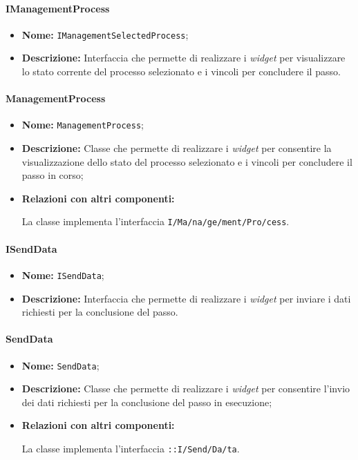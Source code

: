 \paragraph{IManagementProcess}
\begin{itemize}
\item \textbf{Nome:} \texttt{IManagementSelectedProcess};
\item \textbf{Descrizione:} Interfaccia che permette di realizzare i \textit{widget} per visualizzare lo stato corrente del processo selezionato e i vincoli per concludere il passo.
\end{itemize}

\paragraph{ManagementProcess}
\begin{flushleft}
\begin{itemize}
\item \textbf{Nome:} \texttt{ManagementProcess};
\item \textbf{Descrizione:} Classe che permette di realizzare i \textit{widget} per consentire la visualizzazione dello stato del processo selezionato e i vincoli per concludere il passo in corso;
\item \textbf{Relazioni con altri componenti:}
\begin{sloppypar}
La classe implementa l'interfaccia \texttt{I\fshyp{}Ma\fshyp{}na\fshyp{}ge\fshyp{}ment\fshyp{}Pro\fshyp{}cess}.
\end{sloppypar}
\end{itemize}
\end{flushleft}

\paragraph{ISendData}
\begin{itemize}
\item \textbf{Nome:} \texttt{ISendData};
\item \textbf{Descrizione:} Interfaccia che permette di realizzare i \textit{widget} per inviare i dati richiesti per la conclusione del passo.
\end{itemize}

\paragraph{SendData}
\begin{flushleft}
\begin{itemize}
\item \textbf{Nome:} \texttt{SendData};
\item \textbf{Descrizione:} Classe che permette di realizzare i \textit{widget} per consentire l'invio dei dati richiesti per la conclusione del passo in esecuzione;
\item \textbf{Relazioni con altri componenti:}
\begin{sloppypar}
La classe implementa l'interfaccia \texttt{\iViewUser{}::I\fshyp{}Send\fshyp{}Da\fshyp{}ta}.
\end{sloppypar}
\end{itemize}
\end{flushleft}

